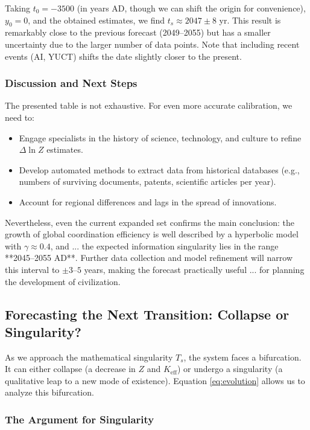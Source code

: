 \documentclass[12pt,a4paper]{article}
\theoremstyle{remark}
\begin{document}
	Taking \(t_0 = -3500\) (in years AD, though we can shift the origin for convenience), \(y_0 = 0\), and the obtained estimates, we find \(t_s \approx 2047 \pm 8\) yr. This result is remarkably close to the previous forecast (2049–2055) but has a smaller uncertainty due to the larger number of data points. Note that including recent events (AI, YUCT) shifts the date slightly closer to the present.
	
	\subsubsection{Discussion and Next Steps}
	
	The presented table is not exhaustive. For even more accurate calibration, we need to:
	\begin{itemize}
		\item Engage specialists in the history of science, technology, and culture to refine \(\Delta \ln Z\) estimates.
		\item Develop automated methods to extract data from historical databases (e.g., numbers of surviving documents, patents, scientific articles per year).
		\item Account for regional differences and lags in the spread of innovations.
	\end{itemize}
	Nevertheless, even the current expanded set confirms the main conclusion: the growth of global coordination efficiency is well described by a hyperbolic model with \(\gamma \approx 0.4\), and ... the expected information singularity lies in the range **2045–2055 AD**. Further data collection and model refinement will narrow this interval to \(\pm 3\)–\(5\) years, making the forecast practically useful ... for planning the development of civilization.
	
	\subsection{Forecasting the Next Transition: Collapse or Singularity?}
	
	As we approach the mathematical singularity $T_s$, the system faces a bifurcation. It can either collapse (a decrease in $Z$ and $K_{\text{eff}}$) or undergo a singularity (a qualitative leap to a new mode of existence). Equation \ref{eq:evolution} allows us to analyze this bifurcation.
	
	\subsubsection{The Argument for Singularity}
	
\end{document}

